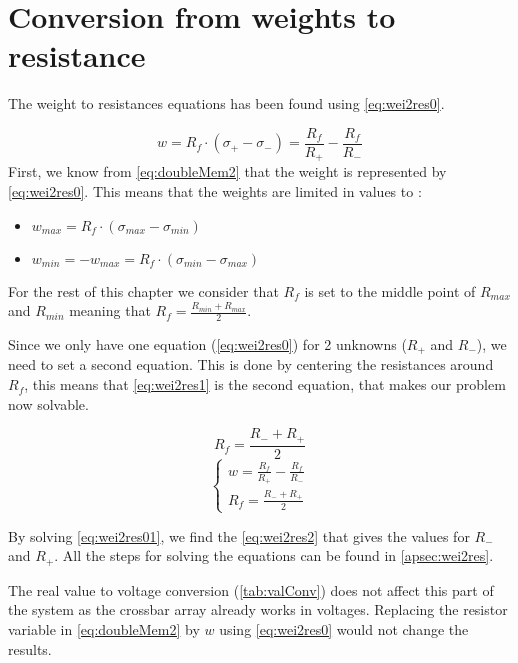 \section{Conversion from weights to resistance}
\label{sec:wei2res}

The weight to resistances equations has been found using \cref{eq:wei2res0}.

\begin{equation}
  \label{eq:wei2res0}
  w=R_f\cdot(\sigma_+-\sigma_-)=\frac{R_f}{R_+}-\frac{R_f}{R_-}
\end{equation}
First, we know from \cref{eq:doubleMem2} that the weight is represented by \cref{eq:wei2res0}. This means that the weights are limited in values to :

\begin{itemize}
  \item $w_{max}=R_f\cdot(\sigma_{max}-\sigma_{min})$
  \item $w_{min}=-w_{max}=R_f\cdot(\sigma_{min}-\sigma_{max})$
\end{itemize}

For the rest of this chapter we consider that $R_f$ is set to the middle point of $R_{max}$ and $R_{min}$ meaning that $R_f=\frac{R_{min}+R_{max}}{2}$.

Since we only have one equation (\cref{eq:wei2res0}) for 2 unknowns ($R_+$ and $R_-$), we need to set a second equation. This is done by centering the resistances around $R_f$, this means that \cref{eq:wei2res1} is the second equation, that makes our problem now solvable.

\begin{equation}
  \label{eq:wei2res1}
  R_f=\frac{R_-+R_+}{2}
\end{equation}
\begin{equation}
  \label{eq:wei2res01}
  \begin{cases}
    w=\frac{R_f}{R_+}-\frac{R_f}{R_-}\\
    R_f=\frac{R_-+R_+}{2}
  \end{cases}
\end{equation}

By solving \cref{eq:wei2res01}, we find the \cref{eq:wei2res2} that gives the values for $R_-$ and $R_+$. All the steps for solving the equations can be found in \cref{apsec:wei2res}.

The real value to voltage conversion (\cref{tab:valConv}) does not affect this part of the system as the crossbar array already works in voltages. Replacing the resistor variable in \cref{eq:doubleMem2} by $w$ using \cref{eq:wei2res0} would not change the results.

